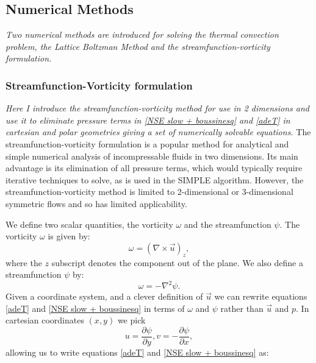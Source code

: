 \documentclass{article}
\begin{document}
\subsection*{Numerical Methods}

{\it{Two numerical methods are introduced for solving the thermal convection problem, the Lattice Boltzman Method and the streamfunction-vorticity formulation. }}

\subsubsection*{Streamfunction-Vorticity formulation}
{\it{Here I introduce the streamfunction-vorticity method for use in 2 dimensions and use it to eliminate pressure terms in \ref{NSE slow + boussinesq} and \ref{adeT} in cartesian and polar geometries giving a set of numerically solvable equations.}}
\vspace{0.3cm}
\newline
\noindent The streamfunction-vorticity formulation is a popular method for analytical and simple numerical analysis of incompressable fluids in two dimensions. Its main advantage is its elimination of all pressure terms, which would typically require iterative techniques to solve, as is used in the SIMPLE algorithm. However, the streamfunction-vorticity method is limited to 2-dimensional or 3-dimensional symmetric flows and so has limited applicability.

We define two scalar quantities, the vorticity $\omega$ and the streamfunction $\psi$. The vorticity $\omega$ is given by:
\begin{equation}
	\omega = (\nabla \times \vec{u})_z,
	\label{omega}
\end{equation}
where the $z$ subscript denotes the component out of the plane. We also define a streamfunction $\psi$ by:
\begin{equation}
	\omega = - \nabla^2 \psi.
	\label{psi}
\end{equation}
Given a coordinate system, and a clever definition of $\vec{u}$ we can rewrite equations \ref{adeT} and \ref{NSE slow + boussinesq} in terms of $\omega$ and $\psi$ rather than $\vec{u}$ and $p$. In cartesian coordinates $(x,y)$ we pick 
\begin{equation}
	u = \frac{\partial \psi}{\partial y}, v = -\frac{\partial \psi}{\partial x},
	\label{cartesian velocities}
\end{equation}
allowing us to write equations \ref{adeT} and \ref{NSE slow + boussinesq} as:
\end{document}
